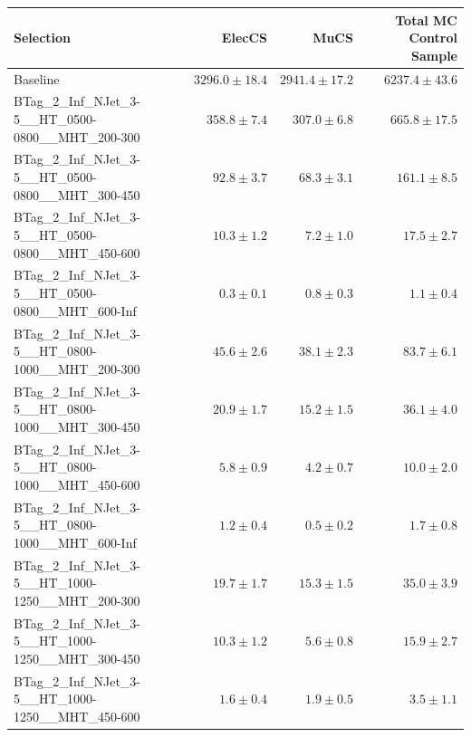 \documentclass{beamer}
\begin{document}
\begin{frame}
\tiny
\begin{tabular}{lrrr}
\toprule

                                                Selection  &                   ElecCS  &                     MuCS  &          Total MC Control Sample  \\ 
\midrule
                                             Baseline &           $3296.0\pm18.4$&           $2941.4\pm17.2$&               $6237.4\pm43.6$ \\ 
 BTag\_2\_Inf\_NJet\_3-5\_\_HT\_0500-0800\_\_MHT\_200-300 &             $358.8\pm7.4$&             $307.0\pm6.8$&                $665.8\pm17.5$ \\ 
 BTag\_2\_Inf\_NJet\_3-5\_\_HT\_0500-0800\_\_MHT\_300-450 &              $92.8\pm3.7$&              $68.3\pm3.1$&                 $161.1\pm8.5$ \\ 
 BTag\_2\_Inf\_NJet\_3-5\_\_HT\_0500-0800\_\_MHT\_450-600 &              $10.3\pm1.2$&               $7.2\pm1.0$&                  $17.5\pm2.7$ \\ 
 BTag\_2\_Inf\_NJet\_3-5\_\_HT\_0500-0800\_\_MHT\_600-Inf &               $0.3\pm0.1$&               $0.8\pm0.3$&                   $1.1\pm0.4$ \\ 
 BTag\_2\_Inf\_NJet\_3-5\_\_HT\_0800-1000\_\_MHT\_200-300 &              $45.6\pm2.6$&              $38.1\pm2.3$&                  $83.7\pm6.1$ \\ 
 BTag\_2\_Inf\_NJet\_3-5\_\_HT\_0800-1000\_\_MHT\_300-450 &              $20.9\pm1.7$&              $15.2\pm1.5$&                  $36.1\pm4.0$ \\ 
 BTag\_2\_Inf\_NJet\_3-5\_\_HT\_0800-1000\_\_MHT\_450-600 &               $5.8\pm0.9$&               $4.2\pm0.7$&                  $10.0\pm2.0$ \\ 
 BTag\_2\_Inf\_NJet\_3-5\_\_HT\_0800-1000\_\_MHT\_600-Inf &               $1.2\pm0.4$&               $0.5\pm0.2$&                   $1.7\pm0.8$ \\ 
 BTag\_2\_Inf\_NJet\_3-5\_\_HT\_1000-1250\_\_MHT\_200-300 &              $19.7\pm1.7$&              $15.3\pm1.5$&                  $35.0\pm3.9$ \\ 
 BTag\_2\_Inf\_NJet\_3-5\_\_HT\_1000-1250\_\_MHT\_300-450 &              $10.3\pm1.2$&               $5.6\pm0.8$&                  $15.9\pm2.7$ \\ 
 BTag\_2\_Inf\_NJet\_3-5\_\_HT\_1000-1250\_\_MHT\_450-600 &               $1.6\pm0.4$&               $1.9\pm0.5$&                   $3.5\pm1.1$ \\ 

\end{tabular}
\end{frame}
\end{document}
